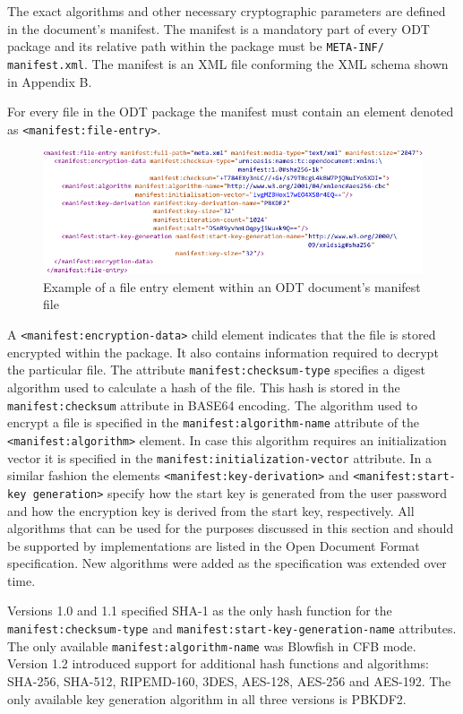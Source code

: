 \documentclass[11pt,oneside]{fithesis2}
\begin{document}
The exact algorithms and other necessary cryptographic parameters are defined in the document's manifest. The manifest is a mandatory part of every ODT package and its relative path within the package must be \texttt{META-INF/}
\texttt{manifest.xml}. The manifest is an XML file conforming the XML schema shown in Appendix B.

For every file in the ODT package the manifest must contain an element denoted as \texttt{<manifest:file-entry>}.

\begin{figure}[ht]
	\centering
	\includegraphics[width=1\textwidth]{figures/manifest_snippet.pdf}
	\caption{Example of a file entry element within an ODT document's manifest file}
	\label{manifest_snippet}
\end{figure}

A \texttt{<manifest:encryption-data>} child element indicates that the file is stored encrypted within the package. It also contains information required to decrypt the particular file. The attribute \texttt{manifest:checksum-type} specifies a digest algorithm used to calculate a hash of the file. This hash is stored in the \texttt{manifest:checksum} attribute in BASE64 encoding. 
The algorithm used to encrypt a file is specified in the \texttt{manifest:algorithm-name} attribute of the \texttt{<manifest:algorithm>} element. In case this algorithm requires an initialization vector it is specified in the \texttt{manifest:initialization-vector} attribute.
In a similar fashion the elements \texttt{<manifest:key-derivation>} and \texttt{<manifest:start-key generation>} specify how the start key is generated from the user password and how the encryption key is derived from the start key, respectively.
All algorithms that can be used for the purposes discussed in this section and should be supported by implementations are listed in the Open Document Format specification. New algorithms were added as the specification was extended over time. 

Versions 1.0 and 1.1 specified SHA-1 as the only hash function for the \texttt{manifest:checksum-type} and \texttt{manifest:start-key-generation-name} attributes. The only available \texttt{manifest:algorithm-name} was Blowfish in CFB mode. Version 1.2 introduced support for additional hash functions and algorithms: SHA-256, SHA-512, RIPEMD-160, 3DES, AES-128, AES-256 and AES-192. The only available key generation algorithm in all three versions is PBKDF2.
\end{document}

